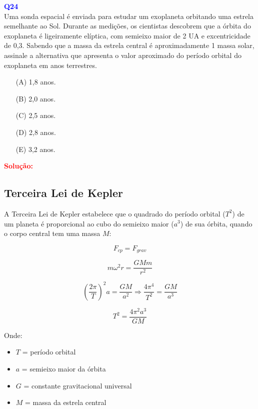 \documentclass[a4paper,12pt]{article}
\begin{document}
\begin{flushleft}
\textbf{\textcolor{blue}{\Large Q24}}\\

Uma sonda espacial é enviada para estudar um exoplaneta orbitando uma estrela semelhante ao
Sol. Durante as medições, os cientistas descobrem que a órbita do exoplaneta é
ligeiramente elíptica, com semieixo maior de 2 UA e excentricidade de 0{,}3. Sabendo que a massa da
estrela central é aproximadamente 1 massa solar, assinale a alternativa que apresenta o valor
aproximado do período orbital do exoplaneta em anos terrestres.

\begin{itemize}
\item[(A)] 1,8 anos.
\item[(B)] 2,0 anos.  
\item[(C)] 2,5 anos.
\item[(D)] 2,8 anos.
\item[(E)] 3,2 anos.
\end{itemize}

\vspace{0.5cm}

\textcolor{red}{\textbf{Solução:}}\\

\subsection*{Terceira Lei de Kepler}

A Terceira Lei de Kepler estabelece que o quadrado do período orbital (\(T^2\)) de um planeta é proporcional ao cubo do 
semieixo maior (\(a^3\)) de sua órbita, quando o corpo central tem uma massa \(M\):

\[
F_{cp} = F_{grav}
\]

\[
m\omega^2 r = \frac{GMm}{r^2}
\]

\[
\left(\frac{2\pi}{T}\right)^2 a = \frac{G M}{a^2} \Rightarrow \frac{4\pi^4}{T^{2}} = \frac{GM}{a^3}
\]

\[
\boxed{
T^2 = \frac{4\pi^2 a^3}{G M}
}
\]

Onde:

\begin{itemize}
    \item \( T \) = período orbital
    \item \( a \) = semieixo maior da órbita
    \item \( G \) = constante gravitacional universal
    \item \( M \) = massa da estrela central
\end{itemize}


\end{flushleft}
\end{document}
